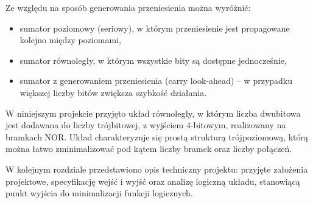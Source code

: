 \documentclass[11pt]{article}
\begin{document}
Ze względu na sposób generowania przeniesienia można wyróżnić:
\begin{itemize}
    \item sumator poziomowy (seriowy), w którym przeniesienie jest propagowane kolejno między poziomami,
    \item sumator równoległy, w którym wszystkie bity są dostępne jednocześnie,
    \item sumator z generowaniem przeniesienia (carry look-ahead) -- w przypadku większej liczby bitów zwiększa szybkość działania.
\end{itemize}

W niniejszym projekcie przyjęto układ równoległy, w którym liczba dwubitowa jest dodawana do liczby trójbitowej, z wyjściem 4-bitowym, realizowany na bramkach NOR. Układ charakteryzuje się prostą strukturą trójpoziomową, którą można łatwo zminimalizować pod kątem liczby bramek oraz liczby połączeń.

W kolejnym rozdziale przedstawiono opis techniczny projektu: przyjęte założenia projektowe, specyfikację wejść i wyjść oraz analizę logiczną układu, stanowiącą punkt wyjścia do minimalizacji funkcji logicznych.
\end{document}
